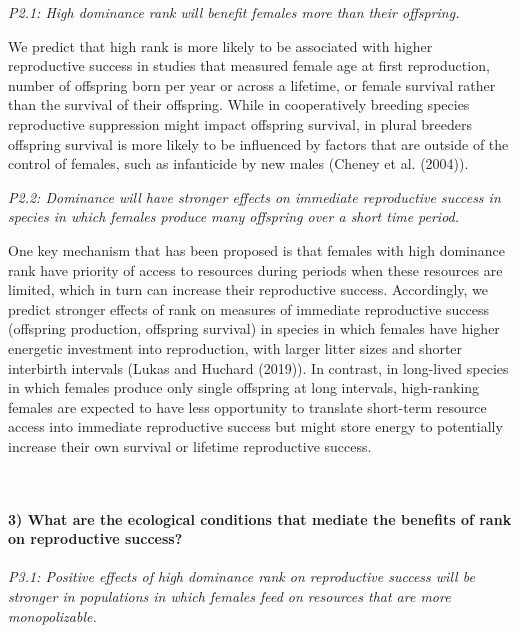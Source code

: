 \documentclass[]{article}
\let\oldparagraph\paragraph
\renewcommand{\paragraph}[1]{\oldparagraph{#1}\mbox{}}
\begin{document}
\emph{P2.1: High dominance rank will benefit females more than their
offspring.}

We predict that high rank is more likely to be associated with higher
reproductive success in studies that measured female age at first
reproduction, number of offspring born per year or across a lifetime, or
female survival rather than the survival of their offspring. While in
cooperatively breeding species reproductive suppression might impact
offspring survival, in plural breeders offspring survival is more likely
to be influenced by factors that are outside of the control of females,
such as infanticide by new males (Cheney et al. (2004)).

\emph{P2.2: Dominance will have stronger effects on immediate
reproductive success in species in which females produce many offspring
over a short time period.}

One key mechanism that has been proposed is that females with high
dominance rank have priority of access to resources during periods when
these resources are limited, which in turn can increase their
reproductive success. Accordingly, we predict stronger effects of rank
on measures of immediate reproductive success (offspring production,
offspring survival) in species in which females have higher energetic
investment into reproduction, with larger litter sizes and shorter
interbirth intervals (Lukas and Huchard (2019)). In contrast, in
long-lived species in which females produce only single offspring at
long intervals, high-ranking females are expected to have less
opportunity to translate short-term resource access into immediate
reproductive success but might store energy to potentially increase
their own survival or lifetime reproductive success.

~

\hypertarget{what-are-the-ecological-conditions-that-mediate-the-benefits-of-rank-on-reproductive-success-1}{%
\paragraph{\texorpdfstring{\textbf{3) What are the ecological conditions
that mediate the benefits of rank on reproductive
success?}}{3) What are the ecological conditions that mediate the benefits of rank on reproductive success?}}\label{what-are-the-ecological-conditions-that-mediate-the-benefits-of-rank-on-reproductive-success-1}}

\emph{P3.1: Positive effects of high dominance rank on reproductive
success will be stronger in populations in which females feed on
resources that are more monopolizable.}
\end{document}
